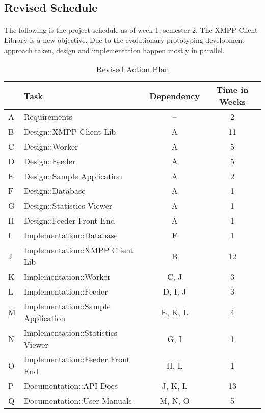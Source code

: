 \subsection{Revised Schedule}
\paragraph{}
The following is the project schedule as of week 1, semester 2. The XMPP Client Library is a new objective. Due to the evolutionary prototyping development approach taken, design and implementation happen mostly in parallel.

\begin{table}[H]
\begin{tabularx}{\linewidth}{llcc}
\toprule
\textbf{} & \textbf{Task} & \textbf{Dependency} & \textbf{Time in Weeks} \\
\midrule
\endhead
A & Requirements                       & --      & 2  \\
B & Design::XMPP Client Lib            & A       & 11 \\
C & Design::Worker                     & A       & 5  \\
D & Design::Feeder                     & A       & 5  \\
E & Design::Sample Application         & A       & 2  \\
F & Design::Database                   & A       & 1  \\
G & Design::Statistics Viewer          & A       & 1  \\
H & Design::Feeder Front End           & A       & 1  \\
I & Implementation::Database           & F       & 1  \\
J & Implementation::XMPP Client Lib    & B       & 12 \\
K & Implementation::Worker             & C, J    & 3  \\
L & Implementation::Feeder             & D, I, J & 3  \\
M & Implementation::Sample Application & E, K, L & 4  \\
N & Implementation::Statistics Viewer  & G, I    & 1  \\
O & Implementation::Feeder Front End   & H, L    & 1  \\
P & Documentation::API Docs            & J, K, L & 13 \\
Q & Documentation::User Manuals        & M, N, O & 5  \\
\bottomrule
\end{tabularx}
\caption{Revised Action Plan}
\label{tab:rev_actionplan}
\end{table}

